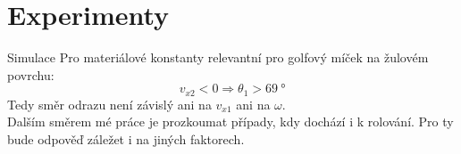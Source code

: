 \documentclass{beamer}
\begin{document}
\section{Experimenty}
\begin{frame}
 \sectionpage
\end{frame}

 \begin{frame}{Simulace}
 Pro materiálové konstanty relevantní pro golfový míček na žulovém povrchu:
 \[
  v_{x2} < 0 \Rightarrow \theta_1 > \qty{69}{\degree}
 \]
 Tedy směr odrazu není závislý ani na $v_{x1}$ ani na $\omega$.\\
 Dalším směrem mé práce je prozkoumat případy, kdy dochází i k rolování. Pro ty
 bude odpověď záležet i na jiných faktorech.
\end{frame}
\end{document}
